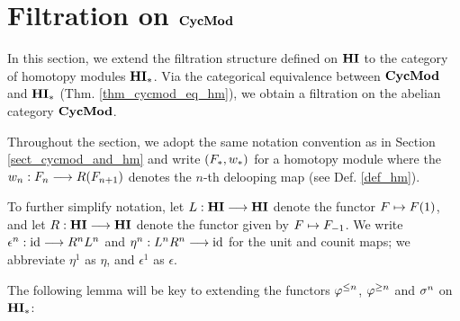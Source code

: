 \newpage
\section{Filtration on $\mathbf{CycMod}$}\label{sect_filtration_cycmod}

In this section, we extend the filtration structure defined on 
$\mathbf{HI}$ to the category of homotopy modules $\mathbf{HI}_*$. Via the 
categorical equivalence between $\mathbf{CycMod}$ and $\mathbf{HI}_*$ (Thm. 
\ref{thm_cycmod_eq_hm}), we obtain a filtration on the abelian 
category $\mathbf{CycMod}$.

Throughout the section, we adopt the same notation convention as 
in Section \ref{sect_cycmod_and_hm} and write $(F_*, w_*)$ 
for a homotopy module where the $w_n: F_{n} \longrightarrow 
R(F_{n + 1})$ denotes the $n$-th delooping map (see Def. 
\ref{def_hm}). 

To further simplify notation, let $L: \mathbf{HI} \longrightarrow \mathbf{HI}$ denote the 
functor $F \mapsto F(1)$, and let $R: \mathbf{HI} \longrightarrow \mathbf{HI}$ denote the 
functor given by $F \mapsto F_{-1}$. We write $\epsilon^n : \mathrm{id} 
\longrightarrow R^nL^n$ and $\eta^n: L^nR^n \longrightarrow \mathrm{id}$ for the unit and counit 
maps; we abbreviate $\eta^1$ as $\eta$, and $\epsilon^1$ as 
$\epsilon$.

The following lemma will be key to extending the functors 
$\varphi^{\leq n}$, $\varphi^{\geq n}$ and $\sigma^{n}$ on $\mathbf{HI}_*$:


